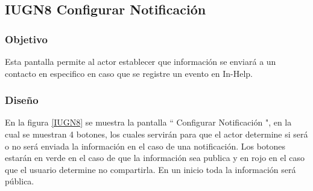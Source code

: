 \subsection{IUGN8 Configurar Notificación}

\subsubsection{Objetivo}

	
    Esta pantalla permite al actor establecer que información se enviará a un contacto en especifico en caso que se registre un evento en In-Help. 

\subsubsection{Diseño}


    En la figura \ref{IUGN8} se muestra la pantalla `` Configurar Notificación ", en la cual se muestran 4 botones, los cuales servirán para que el actor determine si será o no será enviada la información en el caso de una notificación. Los botones estarán en verde en el caso de que la información sea publica y en rojo en el caso que el usuario determine no compartirla. En un inicio toda la información será pública.\\

